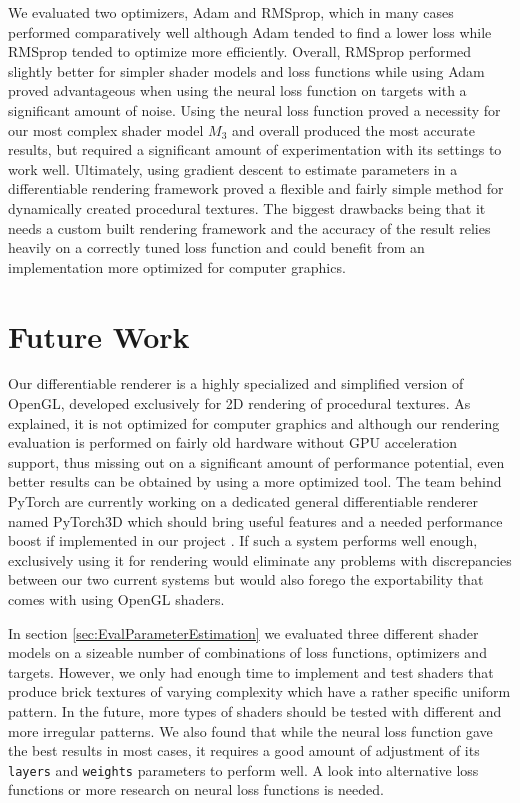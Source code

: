 We evaluated two optimizers, Adam and RMSprop, which in many cases performed comparatively well although Adam tended to find a lower loss while RMSprop tended to optimize more efficiently. Overall, RMSprop performed slightly better for simpler shader models and loss functions while using Adam proved advantageous when using the neural loss function on targets with a significant amount of noise. Using the neural loss function proved a necessity for our most complex shader model $M_3$ and overall produced the most accurate results, but required a significant amount of experimentation with its settings to work well. Ultimately, using gradient descent to estimate parameters in a differentiable rendering framework proved a flexible and fairly simple method for dynamically created procedural textures. The biggest drawbacks being that it needs a custom built rendering framework and the accuracy of the result relies heavily on a correctly tuned loss function and could benefit from an implementation more optimized for computer graphics.


\section{Future Work}

Our differentiable renderer is a highly specialized and simplified version of OpenGL, developed exclusively for 2D rendering of procedural textures. As explained, it is not optimized for computer graphics and although our rendering evaluation is performed on fairly old hardware without GPU acceleration support, thus missing out on a significant amount of performance potential, even better results can be obtained by using a more optimized tool. The team behind PyTorch are currently working on a dedicated general differentiable renderer named PyTorch3D which should bring useful features and a needed performance boost if implemented in our project \cite{facebookresearch_2020_facebookresearchpytorch3d}. If such a system performs well enough, exclusively using it for rendering would eliminate any problems with discrepancies between our two current systems but would also forego the exportability that comes with using OpenGL shaders.

In section \ref{sec:EvalParameterEstimation} we evaluated three different shader models on a sizeable number of combinations of loss functions, optimizers and targets. However, we only had enough time to implement and test shaders that produce brick textures of varying complexity which have a rather specific uniform pattern. In the future, more types of shaders should be tested with different and more irregular patterns. We also found that while the neural loss function gave the best results in most cases, it requires a good amount of adjustment of its \texttt{layers} and \texttt{weights} parameters to perform well. A look into alternative loss functions or more research on neural loss functions is needed.
